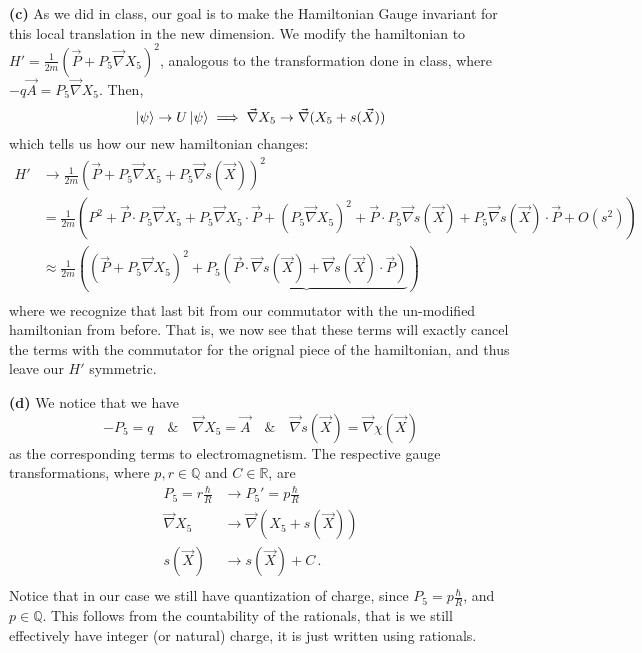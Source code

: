 \documentclass[10pt]{article}
\newcommand{\R}{\mathbb{R}}
\newcommand{\Q}{\mathbb{Q}}
\begin{document}
\textbf{(c)} As we did in class, our goal is to make the Hamiltonian Gauge invariant for this local translation in the new dimension. We modify the hamiltonian to $H' = \frac{1}{2m}(\vec{P} + P_{5}\vec{\nabla}X_{5})^{2}$, analogous to the transformation done in class, where $-q\vec{A} = P_{5}\vec{\nabla}X_{5}$. Then,
\[\ket{\psi} \to  U\ket{\psi} \implies \vec{\nabla}X_{5} \to \vec{\nabla}(X_{5} + s(\vec{X})) \]
which tells us how our new hamiltonian changes:
\begin{equation*}
  \begin{split}
     H' & \to \frac{1}{2m}\left(\vec{P} + P_{5}\vec{\nabla}X_{5} + P_{5}\vec{\nabla}s(\vec{X})\right)^{2} \\
     & = \frac{1}{2m}\left(P^{2} + \vec{P}\cdot P_{5}\vec{\nabla}X_{5} + P_{5}\vec{\nabla}X_{5}\cdot \vec{P} + \left(P_{5}\vec{\nabla}X_{5}\right)^{2} + \vec{P}\cdot P_{5}\vec{\nabla}s(\vec{X}) + P_{5}\vec{\nabla}s(\vec{X}) \cdot \vec{P} + O(s^{2})\right) \\
     & \approx \frac{1}{2m}\left(\left(\vec{P} + P_{5}\vec{\nabla}X_{5}\right)^{2} + \underbrace{P_{5}\left(\vec{P}\cdot \vec{\nabla}s(\vec{X}) + \vec{\nabla}s(\vec{X}) \cdot \vec{P}\right)}\right) \\
  \end{split}
\end{equation*}
where we recognize that last bit from our commutator with the un-modified hamiltonian from before. That is, we now see that these terms will exactly cancel the terms with the commutator for the orignal piece of the hamiltonian, and thus leave our $H'$ symmetric.

\textbf{(d)} We notice that we have
\[ -P_{5} = q \quad \& \quad \vec{\nabla}X_{5} = \vec{A} \quad \& \quad \vec{\nabla}s(\vec{X}) = \vec{\nabla}\chi(\vec{X}) \]
as the corresponding terms to electromagnetism. The respective gauge transformations, where $p,r\in \Q$ and $C\in \R$, are
\begin{equation*}
  \begin{split}
    P_{5} = r\frac{\hbar}{R} & \to P_{5}' = p\frac{\hbar}{R} \\  
    \vec{\nabla}X_{5} & \to \vec{\nabla}(X_{5} + s(\vec{X})) \\
    s(\vec{X}) & \to s(\vec{X}) + C \, .\\
  \end{split}
\end{equation*}
Notice that in our case we still have quantization of charge, since $P_{5} = p\frac{\hbar}{R}$, and $p\in \Q$. This follows from the countability of the rationals, that is we still effectively have integer (or natural) charge, it is just written using rationals.
\end{document}
